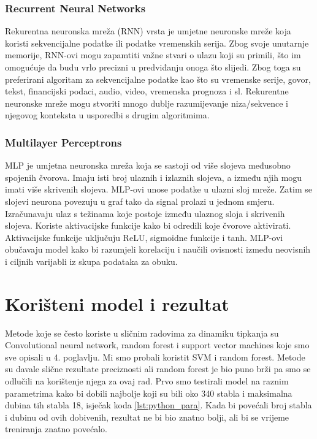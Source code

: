 \documentclass[]{foi}
\begin{document}
\subsection{Recurrent Neural Networks}
Rekurentna neuronska mreža (RNN) vrsta je umjetne neuronske mreže koja koristi sekvencijalne podatke ili podatke vremenskih serija. Zbog svoje unutarnje memorije, RNN-ovi mogu zapamtiti važne stvari o ulazu koji su primili, što im omogućuje da budu vrlo precizni u predviđanju onoga što slijedi. Zbog toga su preferirani algoritam za sekvencijalne podatke kao što su vremenske serije, govor, tekst, financijski podaci, audio, video, vremenska prognoza i sl. Rekurentne neuronske mreže mogu stvoriti mnogo dublje razumijevanje niza/sekvence i njegovog konteksta u usporedbi s drugim algoritmima. \cite{Donges}

\subsection{Multilayer Perceptrons}
MLP je umjetna neuronska mreža koja se sastoji od više slojeva međusobno spojenih čvorova. Imaju isti broj ulaznih i izlaznih slojeva, a između njih mogu imati više skrivenih slojeva. 
MLP-ovi unose podatke u ulazni sloj mreže. Zatim se slojevi neurona povezuju u graf tako da signal prolazi u jednom smjeru. Izračunavaju ulaz s težinama koje postoje između ulaznog sloja i skrivenih slojeva. Koriste aktivacijske funkcije kako bi odredili koje čvorove aktivirati. Aktivacijske funkcije uključuju ReLU, sigmoidne funkcije i tanh. MLP-ovi obučavaju model kako bi razumjeli korelaciju i naučili ovisnosti između neovisnih i ciljnih varijabli iz skupa podataka za obuku. \cite{Simplilearn}


\chapter{Korišteni model i rezultat}
Metode koje se često koriste u sličnim radovima za dinamiku tipkanja su Convolutional neural network, random forest i support vector machines koje smo sve opisali u 4. poglavlju. Mi smo probali koristit SVM i random forest. Metode su davale slične rezultate preciznosti ali random forest je bio puno brži pa smo se odlučili na korištenje njega za ovaj rad. Prvo smo testirali model na raznim parametrima kako bi dobili najbolje koji su bili oko 340 stabla i maksimalna dubina tih stabla 18, isječak koda \ref{lst:python_para}. Kada bi povećali broj stabla i dubinu od ovih dobivenih, rezultat ne bi bio znatno bolji, ali bi se vrijeme treniranja znatno povećalo.
\end{document}
